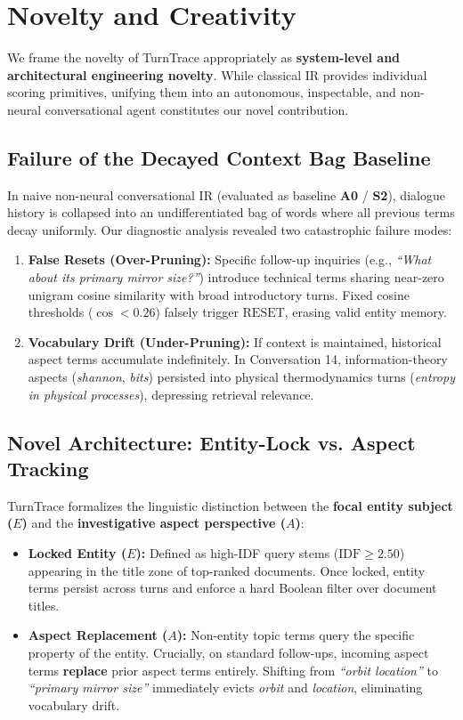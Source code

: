 \documentclass[10pt,a4paper,twocolumn]{article}
\begin{document}
\section{Novelty and Creativity}
\label{sec:novelty}

We frame the novelty of TurnTrace appropriately as \textbf{system-level and architectural engineering novelty}. While classical IR provides individual scoring primitives, unifying them into an autonomous, inspectable, and non-neural conversational agent constitutes our novel contribution.

\subsection{Failure of the Decayed Context Bag Baseline}
In naive non-neural conversational IR (evaluated as baseline \textbf{A0} / \textbf{S2}), dialogue history is collapsed into an undifferentiated bag of words where all previous terms decay uniformly. Our diagnostic analysis revealed two catastrophic failure modes:
\begin{enumerate}
    \item \textbf{False Resets (Over-Pruning):} Specific follow-up inquiries (e.g., \textit{``What about its primary mirror size?''}) introduce technical terms sharing near-zero unigram cosine similarity with broad introductory turns. Fixed cosine thresholds ($\cos < 0.26$) falsely trigger $\text{RESET}$, erasing valid entity memory.
    \item \textbf{Vocabulary Drift (Under-Pruning):} If context is maintained, historical aspect terms accumulate indefinitely. In Conversation 14, information-theory aspects (\textit{shannon}, \textit{bits}) persisted into physical thermodynamics turns (\textit{entropy in physical processes}), depressing retrieval relevance.
\end{enumerate}

\subsection{Novel Architecture: Entity-Lock vs. Aspect Tracking}
TurnTrace formalizes the linguistic distinction between the \textbf{focal entity subject ($E$)} and the \textbf{investigative aspect perspective ($A$)}:
\begin{itemize}
    \item \textbf{Locked Entity ($E$):} Defined as high-IDF query stems ($\text{IDF} \ge 2.50$) appearing in the title zone of top-ranked documents. Once locked, entity terms persist across turns and enforce a hard Boolean filter over document titles.
    \item \textbf{Aspect Replacement ($A$):} Non-entity topic terms query the specific property of the entity. Crucially, on standard follow-ups, incoming aspect terms \textbf{replace} prior aspect terms entirely. Shifting from \textit{``orbit location''} to \textit{``primary mirror size''} immediately evicts \textit{orbit} and \textit{location}, eliminating vocabulary drift.
\end{itemize}
\end{document}

